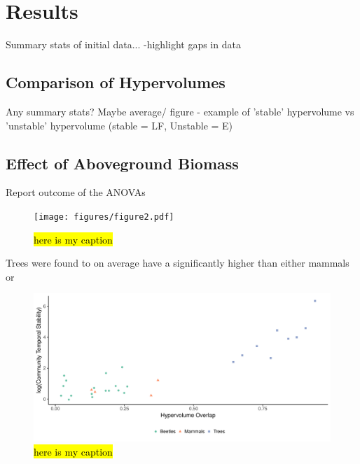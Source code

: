 
\section{Results}


Summary stats of initial data... -highlight gaps in data


\subsection{Comparison of Hypervolumes}
Any summary stats? Maybe average/
figure - example of 'stable' hypervolume vs 'unstable' hypervolume (stable = LF, Unstable = E)



\subsection{Effect of Aboveground Biomass}

Report outcome of the ANOVAs

\begin{figure}[H]
	\centering
	\texttt{[image: figures/figure2.pdf]}
	\caption{\hl{here is my caption}}
	\label{fig:2}
\end{figure}

Trees were found to on average have a significantly higher than either mammals or


\begin{figure}[H]
	\centering
	\includegraphics[width=\textwidth]{figures/figure3.pdf}
	\caption{\hl{here is my caption}}
	\label{fig:3}
\end{figure}


